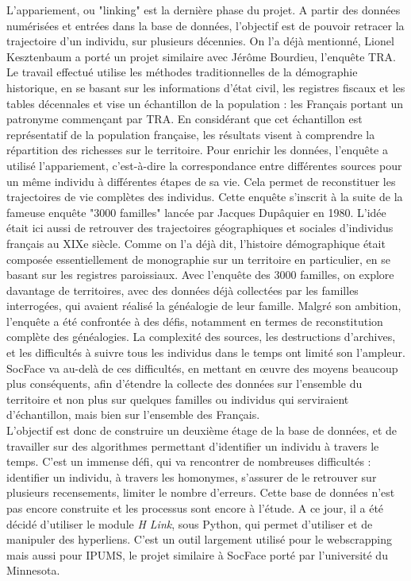L’appariement, ou "linking" est la dernière phase du projet. A partir des données numérisées et entrées dans la base de données, l’objectif est de pouvoir retracer la trajectoire d’un individu, sur plusieurs décennies. On l’a déjà mentionné, Lionel Kesztenbaum a porté un projet similaire avec Jérôme Bourdieu, l’enquête TRA. Le travail effectué utilise les méthodes traditionnelles de la démographie historique, en se basant sur les informations d’état civil, les registres fiscaux et les tables décennales et vise un échantillon de la population : les Français portant un patronyme commençant par TRA. En considérant que cet échantillon est représentatif de la population française, les résultats visent à comprendre la répartition des richesses sur le territoire. Pour enrichir les données, l'enquête a utilisé l'appariement, c'est-à-dire la correspondance entre différentes sources pour un même individu à différentes étapes de sa vie. Cela permet de reconstituer les trajectoires de vie complètes des individus.  
Cette enquête s’inscrit à la suite de la fameuse enquête "3000 familles" lancée par Jacques Dupâquier en 1980. L’idée était ici aussi de retrouver des trajectoires géographiques et sociales d’individus français au XIXe siècle. Comme on l’a déjà dit, l’histoire démographique était composée essentiellement de monographie sur un territoire en particulier, en se basant sur les registres paroissiaux. Avec l’enquête des 3000 familles, on explore davantage de territoires, avec des données déjà collectées par les familles interrogées, qui avaient réalisé la généalogie de leur famille. Malgré son ambition, l'enquête a été confrontée à des défis, notamment en termes de reconstitution complète des généalogies. La complexité des sources, les destructions d'archives, et les difficultés à suivre tous les individus dans le temps ont limité son l'ampleur. SocFace va au-delà de ces difficultés, en mettant en œuvre des moyens beaucoup plus conséquents, afin d’étendre la collecte des données sur l’ensemble du territoire et non plus sur quelques familles ou individus qui serviraient d’échantillon, mais bien sur l'ensemble des Français.\\
L’objectif est donc de construire un deuxième étage de la base de données, et de travailler sur des algorithmes permettant d’identifier un individu à travers le temps. C’est un immense défi, qui va rencontrer de nombreuses difficultés : identifier un individu, à travers les homonymes, s’assurer de le retrouver sur plusieurs recensements, limiter le nombre d’erreurs. Cette base de données n’est pas encore construite et les processus sont encore à l’étude. A ce jour, il a été décidé d’utiliser le module \textit{H Link}, sous Python, qui permet d’utiliser et de manipuler des hyperliens. C’est un outil largement utilisé pour le webscrapping mais aussi pour IPUMS, le projet similaire à SocFace porté par l’université du Minnesota. 
